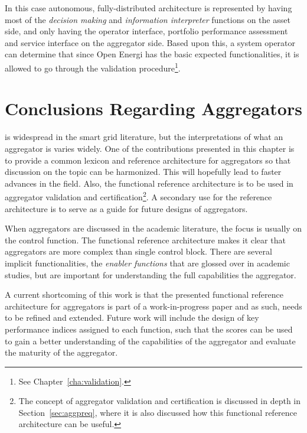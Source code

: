 In this case autonomous, fully-distributed architecture is represented by having  most of the \emph{decision making} and \emph{information interpreter} functions on the asset side, and only having the operator interface, portfolio performance assessment and service interface on the aggregator side. Based upon this, a system operator can determine that since Open Energi has the basic expected functionalities, it is allowed to go through the validation procedure\footnote{See Chapter~\ref{cha:validation}.}. 

\section{Conclusions Regarding Aggregators}
 is widespread in the smart grid literature, but the interpretations of what an aggregator is varies widely. One of the contributions presented in this chapter is to provide a common lexicon and reference architecture for aggregators so that discussion on the topic can be harmonized. This will hopefully lead to faster advances in the field. Also, the functional reference architecture is to be used in aggregator validation and certification\footnote{The concept of aggregator validation and certification is discussed in depth in Section~\ref{sec:aggpreq}, where it is also discussed how this functional reference architecture can be useful.}. A secondary use for the reference architecture is to serve as a guide for future designs of aggregators.

When aggregators are discussed in the academic literature, the focus is usually on the control function. The functional reference architecture makes it clear that aggregators are more complex than single control block. There are several implicit functionalities, \eg the \emph{enabler functions} that are glossed over in academic studies, but are important for understanding the full capabilities the aggregator.

A current shortcoming of this work is that the presented functional reference architecture for aggregators is part of a work-in-progress paper and as such, needs to be refined and extended. Future work will include the design of key performance indices assigned to each function, such that the scores can be used to gain a better understanding of the capabilities of the aggregator and evaluate the maturity of the aggregator. 

